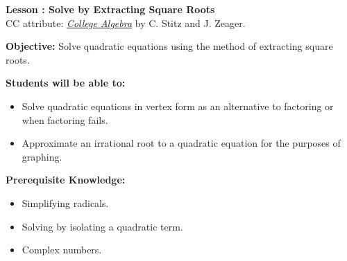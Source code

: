 \documentclass[12pt]{article}
\theoremstyle{definition}
\begin{document}
{\bf \large Lesson : Solve by Extracting Square Roots}\label{les:extracting_square_roots}
\\ CC attribute: \href{http://www.stitz-zeager.com}{\it{College Algebra}} by C. Stitz and J. Zeager. 
\hfill \doclicenseImage[imagewidth=5em]\\
\par
{\bf Objective:} Solve quadratic equations using the method of extracting square roots.\\
\par
{\bf Students will be able to:}
\begin{itemize}
	\item Solve quadratic equations in vertex form as an alternative to factoring or when factoring fails.
	\item Approximate an irrational root to a quadratic equation for the purposes of graphing.
\end{itemize}
{\bf Prerequisite Knowledge:}
\begin{itemize}
	\item Simplifying radicals.
	\item Solving by isolating a quadratic term.
	\item Complex numbers.
\end{itemize}
\hrulefill
\end{document}
